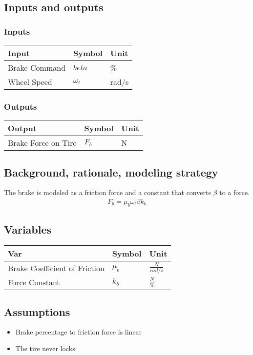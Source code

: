 \documentclass[../SimBALink.tex]{subfiles}
\begin{document}
\subsection{Inputs and outputs}
	\subsubsection{Inputs}
	\begin{tabular}{ l | l | l  }
		Input					&	Symbol		&	Unit		\\	\hline
		Brake Command			& 	$beta$ 		&	\% \\
		Wheel Speed				&	$\omega_t$	&	rad/s
	\end{tabular}
	
	\subsubsection{Outputs}
	\begin{tabular}{ l | l | l  }
		Output					&	Symbol		&	Unit		\\	\hline
		Brake Force on Tire		&	$F_b$		&	N
	\end{tabular}

\subsection{Background, rationale, modeling strategy}
The brake is modeled as a friction force and a constant that converts $\beta$ to a force.
		\begin{gather}
			F_b = \mu_b \omega_t \beta k_b
		\end{gather}


\subsection{Variables}
	\begin{tabular}{ l | l | l  }
		Var									&	Symbol		&	Unit		\\	\hline
		Brake Coefficient of Friction		&	$\mu_b$		&	 $\frac{N}{rad/s}$ \\
		Force Constant						&	$k_b$		&	 $\frac{N}{\%}$
	\end{tabular}

\subsection{Assumptions}
\begin{itemize}
  \item Brake percentage to friction force is linear
  \item The tire never locks
\end{itemize}
\end{document}
